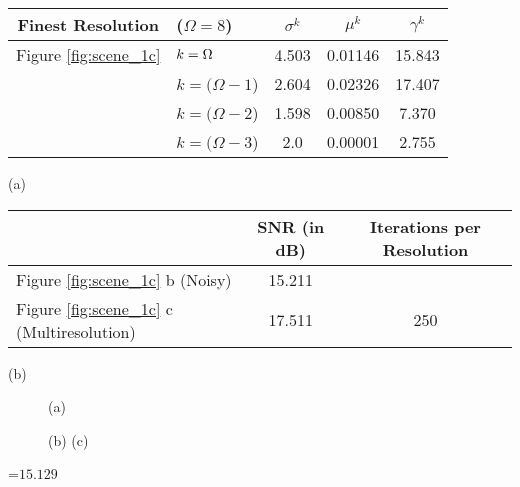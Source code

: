 {\newpage
\clearpage
\samepage \begin{table}%
\begin{center}
 
\begin{tabular}{||cl||c|c|c||} \hline \hline
Finest Resolution &($\Omega=8$)& $\sigma^k$ & $\mu^k$  & $\gamma^k$ \\  
\hline \hline 
 Figure \ref{fig:scene_1c}           & $k=\Omega$  & 4.503 &0.01146& 15.843 \\ 
             &$k=(\Omega
 -1$) & 2.604 &0.02326& 17.407\\ 
             &$k=(\Omega
 -2$) & 1.598 &0.00850& 7.370\\ 
             &$k=(\Omega
 -3$) & 2.0     &0.00001& 2.755 \\  \hline \hline
\end{tabular}
\centerline{(a)} 

\vspace{1ex}

 \begin{tabular}{||l||c|c||} \hline   \hline
& SNR (in dB)& Iterations per Resolution \\  \hline \hline
 Figure \ref{fig:scene_1c}  b (Noisy) &  15.211  &      \\  \hline
 Figure \ref{fig:scene_1c}  c (Multiresolution)& 17.511   & 250  \\  \hline \hline
 \end{tabular}
 \centerline{(b)}
 
 \label{tab:scene_1}
 \end{center}
 
 \end{table}
}

{\newpage
\clearpage
\samepage \begin{figure}\centerline{ \hfill
{} \hfill} 
\centerline{ \hfill (a) \hfill} \vspace{2ex}
\centerline{ \hfill
{} \hfill
{} \hfill
}
\centerline{\hfill (b) \hfill (c) \hfill}

\label{fig:scene_2}
\end{figure}
}

{\newpage
\clearpage
\samepage \setbox\sizebox=\hbox{$15.129$}\box\sizebox
}

